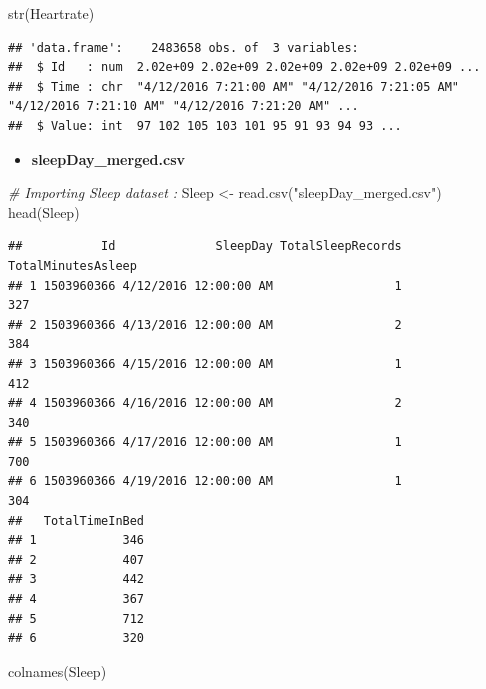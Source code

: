 \documentclass[
]{article}
\newenvironment{Shaded}{\begin{snugshade}}{\end{snugshade}}
\newcommand{\CommentTok}[1]{\textcolor[rgb]{0.56,0.35,0.01}{\textit{#1}}}
\newcommand{\FunctionTok}[1]{\textcolor[rgb]{0.00,0.00,0.00}{#1}}
\newcommand{\NormalTok}[1]{#1}
\newcommand{\OtherTok}[1]{\textcolor[rgb]{0.56,0.35,0.01}{#1}}
\newcommand{\StringTok}[1]{\textcolor[rgb]{0.31,0.60,0.02}{#1}}
\providecommand{\tightlist}{%
  \setlength{\itemsep}{0pt}\setlength{\parskip}{0pt}}
\begin{document}
\begin{Shaded}
\begin{Highlighting}[]
\FunctionTok{str}\NormalTok{(Heartrate)}
\end{Highlighting}
\end{Shaded}

\begin{verbatim}
## 'data.frame':    2483658 obs. of  3 variables:
##  $ Id   : num  2.02e+09 2.02e+09 2.02e+09 2.02e+09 2.02e+09 ...
##  $ Time : chr  "4/12/2016 7:21:00 AM" "4/12/2016 7:21:05 AM" "4/12/2016 7:21:10 AM" "4/12/2016 7:21:20 AM" ...
##  $ Value: int  97 102 105 103 101 95 91 93 94 93 ...
\end{verbatim}

\begin{itemize}
\tightlist
\item
  \textbf{sleepDay\_merged.csv}
\end{itemize}

\begin{Shaded}
\begin{Highlighting}[]
\CommentTok{\# Importing Sleep dataset :}
\NormalTok{Sleep }\OtherTok{\textless{}{-}} \FunctionTok{read.csv}\NormalTok{(}\StringTok{"sleepDay\_merged.csv"}\NormalTok{)}
\FunctionTok{head}\NormalTok{(Sleep)}
\end{Highlighting}
\end{Shaded}

\begin{verbatim}
##           Id              SleepDay TotalSleepRecords TotalMinutesAsleep
## 1 1503960366 4/12/2016 12:00:00 AM                 1                327
## 2 1503960366 4/13/2016 12:00:00 AM                 2                384
## 3 1503960366 4/15/2016 12:00:00 AM                 1                412
## 4 1503960366 4/16/2016 12:00:00 AM                 2                340
## 5 1503960366 4/17/2016 12:00:00 AM                 1                700
## 6 1503960366 4/19/2016 12:00:00 AM                 1                304
##   TotalTimeInBed
## 1            346
## 2            407
## 3            442
## 4            367
## 5            712
## 6            320
\end{verbatim}

\begin{Shaded}
\begin{Highlighting}[]
\FunctionTok{colnames}\NormalTok{(Sleep)}
\end{Highlighting}
\end{Shaded}
\end{document}
